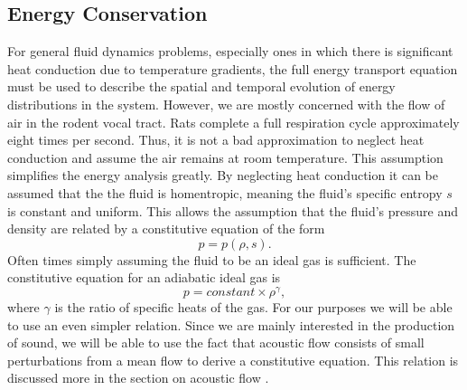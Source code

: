 \documentclass[12pt, letter]{report}
\begin{document}
\subsection{Energy Conservation}
For general fluid dynamics problems, especially ones in which there is significant heat conduction due to temperature gradients, the full energy transport equation must be used to describe the spatial and temporal evolution of energy distributions in the system. However, we are mostly concerned with the flow of air in the rodent vocal tract. Rats complete a full respiration cycle approximately eight times per second. Thus, it is not a bad approximation to neglect heat conduction and assume the air remains at room temperature. This assumption simplifies the energy analysis greatly. By neglecting heat conduction it can be assumed that the the fluid is homentropic, meaning the fluid's specific entropy $s$ is constant and uniform. This allows the assumption that the fluid's pressure and density are related by a constitutive equation of the form
\begin{equation}
\label{eq:constitutive}
p = p(\rho, s).
\end{equation}
Often times simply assuming the fluid to be an ideal gas is sufficient. The constitutive equation for an adiabatic ideal gas is
\begin{equation}
p = constant \times \rho^\gamma,
\end{equation}
where $\gamma$ is the ratio of specific heats of the gas. For our purposes we will be able to use an even simpler relation. Since we are mainly interested in the production of sound, we will be able to use the fact that acoustic flow consists of small perturbations from a mean flow to derive a constitutive equation. This relation is discussed more in the section on acoustic flow \cite{howe2003theory}. 
\end{document}
